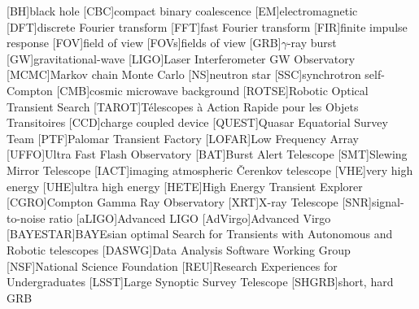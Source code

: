 \usepackage{acronym}

[BH]{black hole}
[CBC]{compact binary coalescence}
[EM]{electromagnetic}
[DFT]{discrete Fourier transform}
[FFT]{fast Fourier transform}
[FIR]{finite impulse response}
[FOV]{field of view}
[FOVs]{fields of view}
[GRB]{$\gamma$\nobreakdashes-ray burst}
[GW]{gravitational\nobreakdashes-wave}
[LIGO]{Laser Interferometer \acs{GW} Observatory}
[MCMC]{Markov chain Monte Carlo}
[NS]{neutron star}
[SSC]{synchrotron self\nobreakdashes-Compton}
[CMB]{cosmic microwave background}
[ROTSE]{Robotic Optical Transient Search}
[TAROT]{T\'{e}lescopes \`{a} Action Rapide pour les Objets Transitoires}
[CCD]{charge coupled device}
[QUEST]{Quasar Equatorial Survey Team}
[PTF]{Palomar Transient Factory}
[LOFAR]{Low Frequency Array}
[UFFO]{Ultra Fast Flash Observatory}
[BAT]{Burst Alert Telescope}
[SMT]{Slewing Mirror Telescope}
[IACT]{imaging atmospheric \v{C}erenkov telescope}
[VHE]{very high energy}
[UHE]{ultra high energy}
[HETE]{High Energy Transient Explorer}
[CGRO]{Compton Gamma Ray Observatory}
[XRT]{X\nobreakdashes-ray Telescope}
[SNR]{signal\nobreakdashes-to\nobreakdashes-noise ratio}
[aLIGO]{Advanced \acs{LIGO}}
[AdVirgo]{Advanced Virgo}
[BAYESTAR]{BAYEsian optimal Search for Transients with Autonomous and Robotic telescopes}
[DASWG]{Data Analysis Software Working Group}
[NSF]{National Science Foundation}
[REU]{Research Experiences for Undergraduates}
[LSST]{Large Synoptic Survey Telescope}
[SHGRB]{short, hard \acl{GRB}}
